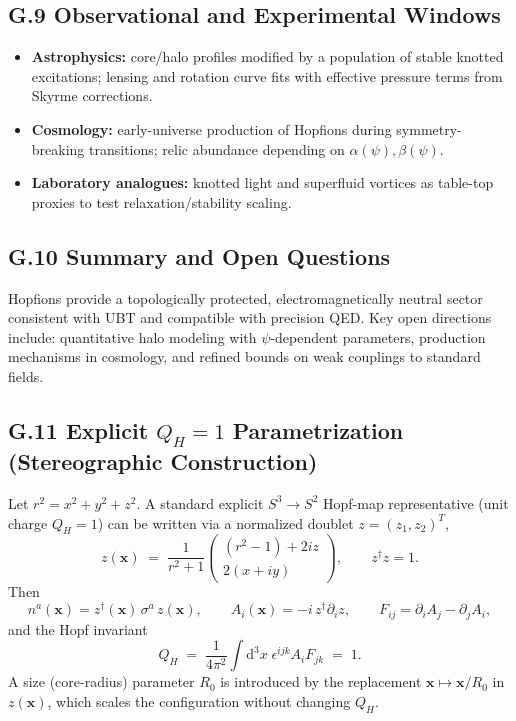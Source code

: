 \documentclass[12pt,a4paper]{article}
\numberwithin{equation}{section}
\theoremstyle{definition}
\theoremstyle{remark}
\begin{document}
\subsection*{G.9 Observational and Experimental Windows}
\begin{itemize}
\item \textbf{Astrophysics:} core/halo profiles modified by a population of stable knotted excitations; lensing and rotation curve fits with effective pressure terms from Skyrme corrections.
\item \textbf{Cosmology:} early-universe production of Hopfions during symmetry-breaking transitions; relic abundance depending on $\alpha(\psi),\beta(\psi)$.
\item \textbf{Laboratory analogues:} knotted light and superfluid vortices as table-top proxies to test relaxation/stability scaling.
\end{itemize}

\subsection*{G.10 Summary and Open Questions}
Hopfions provide a topologically protected, electromagnetically neutral sector consistent with UBT and compatible with precision QED. 
Key open directions include: quantitative halo modeling with $\psi$-dependent parameters, production mechanisms in cosmology, and refined bounds on weak couplings to standard fields.

\subsection*{G.11 Explicit $Q_H=1$ Parametrization (Stereographic Construction)}
Let $r^2=x^2+y^2+z^2$. A standard explicit $S^3\!\to\!S^2$ Hopf-map representative (unit charge $Q_H=1$) can be written via a normalized doublet $z=(z_1,z_2)^T$,
\begin{equation}
z(\mathbf{x}) \;=\; \frac{1}{r^2+1}\begin{pmatrix}
(r^2-1) + 2 i z \\[4pt]
2(x+i y)
\end{pmatrix},\qquad z^\dagger z = 1.
\end{equation}
Then
\begin{equation}
n^a(\mathbf{x}) = z^\dagger(\mathbf{x})\,\sigma^a\, z(\mathbf{x}),\qquad
A_i(\mathbf{x})=-i\, z^\dagger \partial_i z,\qquad F_{ij}=\partial_i A_j-\partial_j A_i,
\end{equation}
and the Hopf invariant
\begin{equation}
Q_H \;=\; \frac{1}{4\pi^2}\int\!\mathrm{d}^3x\;\epsilon^{ijk} A_i F_{jk} \;=\; 1.
\end{equation}
A size (core-radius) parameter $R_0$ is introduced by the replacement $\mathbf{x}\mapsto \mathbf{x}/R_0$ in $z(\mathbf{x})$, which scales the configuration without changing $Q_H$.
\end{document}
